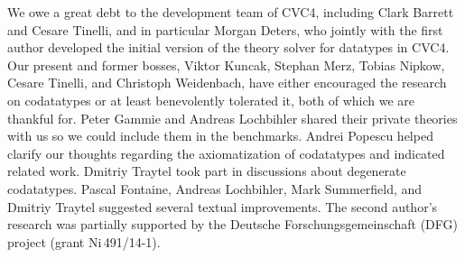 
\def\ackname{Acknowledgment}
\ourparagraph{\ackname.}
We owe a great debt to the development team of CVC4,
including Clark Barrett and Cesare Tinelli,
and in particular Morgan Deters,
who jointly with the first author developed the initial version
of the theory solver for datatypes in CVC4.
%
Our present and former bosses, Viktor Kuncak, Stephan Merz, Tobias Nipkow,
Cesare Tinelli, and Christoph Weidenbach, have either encouraged the research on
codatatypes or at least benevolently tolerated it, both of which we are thankful
for.
%
Peter Gammie and Andreas Lochbihler shared their private
theories with us so we could include them in the benchmarks.
Andrei Popescu helped clarify our thoughts regarding the axiomatization of
codatatypes and indicated related work. Dmitriy Traytel took part in discussions
about degenerate codatatypes.
%
Pascal Fontaine, Andreas Lochbihler, Mark Summerfield, and Dmitriy Traytel
suggested several textual improvements. The second author's research was
partially supported by the Deutsche Forschungs\-gemein\-schaft (DFG) project
 (grant Ni\,491\slash 14-1).


{}


